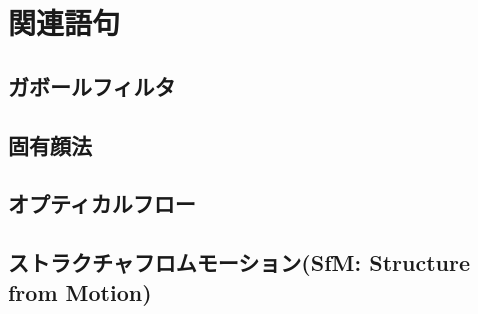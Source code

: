 \chapter{関連語句}
\section{ガボールフィルタ}
\section{固有顔法}
\section{オプティカルフロー}
\section{ストラクチャフロムモーション(SfM: Structure from Motion)}